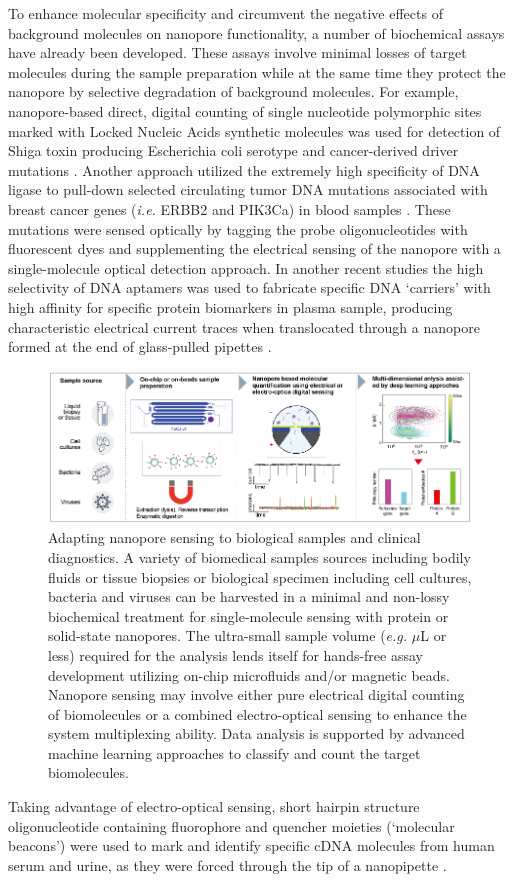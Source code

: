 To enhance molecular specificity and circumvent the negative effects of background molecules on nanopore functionality, a number of biochemical assays have already been developed. These assays involve minimal losses of target molecules during the sample preparation while at the same time they protect the nanopore by selective degradation of background molecules. For example, nanopore-based direct, digital counting of single nucleotide polymorphic sites marked with Locked Nucleic Acids synthetic molecules was used for detection of Shiga toxin producing Escherichia coli serotype and cancer-derived driver mutations \cite{Tian2018,Wang2017a}. Another approach utilized the extremely high specificity of DNA ligase to pull-down selected circulating tumor DNA mutations associated with breast cancer genes (\emph{i.e.} ERBB2 and PIK3Ca) in blood samples \cite{Burck2021}. These mutations were sensed optically by tagging the probe oligonucleotides with fluorescent dyes and supplementing the electrical sensing of the nanopore with a single-molecule optical detection approach. In another recent studies the high selectivity of DNA aptamers was used to fabricate specific DNA `carriers' with high affinity for specific protein biomarkers in plasma sample, producing characteristic electrical current traces when translocated through a nanopore formed at the end of glass-pulled pipettes \cite{Sze2017}. 
\begin{figure}[!htbp]
	\centering
	\includegraphics[width=1\linewidth]{figures/Figure6.5.pdf}
	\caption{Adapting nanopore sensing to biological samples and clinical diagnostics. A variety of biomedical samples sources including bodily fluids or tissue biopsies or biological specimen including cell cultures, bacteria and viruses can be harvested in a minimal and non-lossy biochemical treatment for single-molecule sensing with protein or solid-state nanopores. The ultra-small sample volume (\emph{e.g.} $\mu$L or less) required for the analysis lends itself for hands-free assay development utilizing on-chip microfluids and/or magnetic beads. Nanopore sensing may involve either pure electrical digital counting of biomolecules or a combined electro-optical sensing to enhance the system multiplexing ability. Data analysis is supported by advanced machine learning approaches to classify and count the target biomolecules.}
	\label{fig:fig6.5}
\end{figure}
Taking advantage of electro-optical sensing, short hairpin structure oligonucleotide containing fluorophore and quencher moieties (`molecular beacons') were used to mark and identify specific cDNA molecules from human serum and urine, as they were forced through the tip of a nanopipette \cite{Cai2019}.


